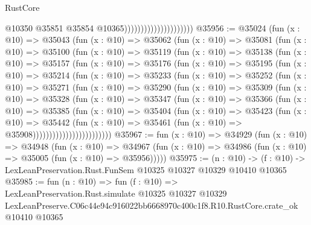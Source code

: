 \begin{lexlean}{RustCore}
\begin{coremodule}
                                              @10350
                                              @35851
                                              @35854
                                              @10365)))))))))))))))))))))
@35956 := @35024
    (fun (x : @10) =>
    @35043
      (fun (x : @10) =>
      @35062
        (fun (x : @10) =>
        @35081
          (fun (x : @10) =>
          @35100
            (fun (x : @10) =>
            @35119
              (fun (x : @10) =>
              @35138
                (fun (x : @10) =>
                @35157
                  (fun (x : @10) =>
                  @35176
                    (fun (x : @10) =>
                    @35195
                      (fun (x : @10) =>
                      @35214
                        (fun (x : @10) =>
                        @35233
                          (fun (x : @10) =>
                          @35252
                            (fun (x : @10) =>
                            @35271
                              (fun (x : @10) =>
                              @35290
                                (fun (x : @10) =>
                                @35309
                                  (fun (x : @10) =>
                                  @35328
                                    (fun (x : @10) =>
                                    @35347
                                      (fun (x : @10) =>
                                      @35366
                                        (fun (x : @10) =>
                                        @35385
                                          (fun (x : @10) =>
                                          @35404
                                            (fun (x : @10) =>
                                            @35423
                                              (fun (x : @10) =>
                                              @35442
                                                (fun (x : @10) =>
                                                @35461
                                                  (fun (x : @10) => @35908))))))))))))))))))))))))
@35967 := fun (x : @10) =>
  @34929
    (fun (x : @10) =>
    @34948
      (fun (x : @10) =>
      @34967 (fun (x : @10) => @34986 (fun (x : @10) => @35005 (fun (x : @10) => @35956)))))
@35975 := (n : @10) ->
  (f : @10) -> LexLeanPreservation.Rust.FunSem @10325 @10327 @10329 @10410 @10365
@35985 := fun (n : @10) =>
  fun (f : @10) =>
  LexLeanPreservation.Rust.simulate
    @10325
    @10327
    @10329
    LexLeanPreserve.C06c44e94c916022bb6668970c400c1f8.R10.RustCore.crate_ok
    @10410
    @10365
\end{coremodule}
\end{lexlean}
